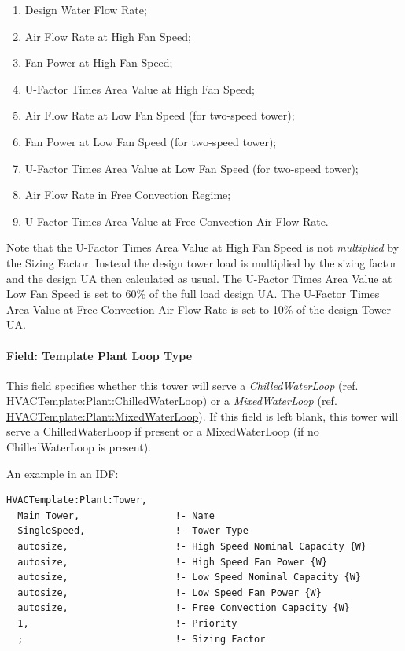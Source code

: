 \begin{enumerate}
\def\labelenumi{\arabic{enumi}.}
\item
  Design Water Flow Rate;
\item
  Air Flow Rate at High Fan Speed;
\item
  Fan Power at High Fan Speed;
\item
  U-Factor Times Area Value at High Fan Speed;
\item
  Air Flow Rate at Low Fan Speed (for two-speed tower);
\item
  Fan Power at Low Fan Speed (for two-speed tower);
\item
  U-Factor Times Area Value at Low Fan Speed (for two-speed tower);
\item
  Air Flow Rate in Free Convection Regime;
\item
  U-Factor Times Area Value at Free Convection Air Flow Rate.
\end{enumerate}

Note that the U-Factor Times Area Value at High Fan Speed is not \emph{multiplied} by the Sizing Factor. Instead the design tower load is multiplied by the sizing factor and the design UA then calculated as usual. The U-Factor Times Area Value at Low Fan Speed is set to 60\% of the full load design UA. The U-Factor Times Area Value at Free Convection Air Flow Rate is set to 10\% of the design Tower UA.

\paragraph{Field: Template Plant Loop Type}\label{field-template-plant-loop-type}

This field specifies whether this tower will serve a \emph{ChilledWaterLoop} (ref. \hyperref[hvactemplateplantchilledwaterloop]{HVACTemplate:Plant:ChilledWaterLoop}) or a \emph{MixedWaterLoop} (ref. \hyperref[hvactemplateplantmixedwaterloop]{HVACTemplate:Plant:MixedWaterLoop}). If this field is left blank, this tower will serve a ChilledWaterLoop if present or a MixedWaterLoop (if no ChilledWaterLoop is present).

An example in an IDF:

\begin{lstlisting}
HVACTemplate:Plant:Tower,
  Main Tower,                 !- Name
  SingleSpeed,                !- Tower Type
  autosize,                   !- High Speed Nominal Capacity {W}
  autosize,                   !- High Speed Fan Power {W}
  autosize,                   !- Low Speed Nominal Capacity {W}
  autosize,                   !- Low Speed Fan Power {W}
  autosize,                   !- Free Convection Capacity {W}
  1,                          !- Priority
  ;                           !- Sizing Factor
\end{lstlisting}

